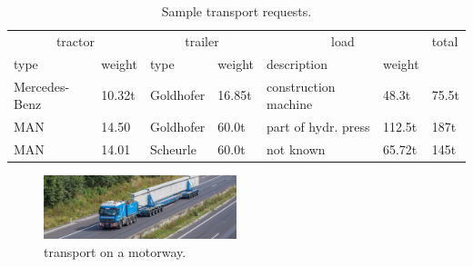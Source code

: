 \begin{table}[!ht]
  \caption{Sample transport requests.}
  \label{tab:sample}
  \centering
\begin{tabular}{ll|ll|ll|l}
  \hline
 \multicolumn{2}{c}{tractor} &  \multicolumn{2}{c}{trailer}  &   \multicolumn{2}{c}{load}  &total\\
 type & weight & type & weight &  description & weight \\ \hline
 Mercedes-Benz  & 10.32t  & Goldhofer  & 16.85t & construction machine & 48.3t   & 75.5t\\
 MAN  & 14.50  & Goldhofer  & 60.0t & part of hydr. press & 112.5t   & 187t\\
 MAN  & 14.01  & Scheurle  & 60.0t & not known & 65.72t   & 145t\\

  \hline
\end{tabular}
\end{table}



\begin{figure}[!ht]
  \centering
  \includegraphics[width=0.5\textwidth]{./figures/felbert.jpg}
  \caption{\ohc transport on a motorway.}
  \label{fig:truck}
\end{figure}

